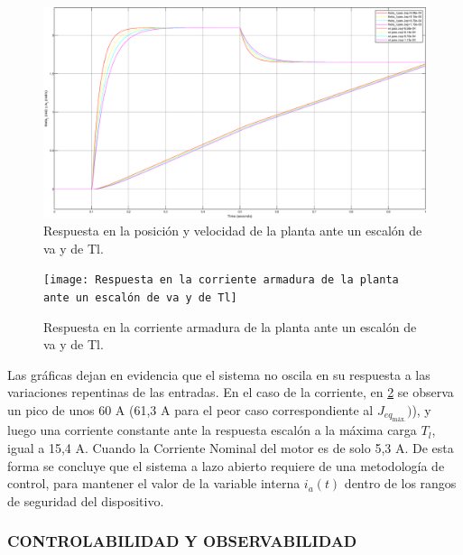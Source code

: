 \documentclass{article}
\begin{document}
\begin{sloppypar}
\begin{figure}[H]
    \centering
    \includegraphics[width=1\textwidth]{Respuesta en la posición y velocidad de la planta ante un escalón de va y de Tl}
    \caption{Respuesta en la posición y velocidad de la planta ante un escalón de va y de Tl.}
    \label{fig:Respuesta en la posición y velocidad de la planta ante un escalón de va y de Tl}
\end{figure}

\begin{figure}[H]
    \centering
    \texttt{[image: Respuesta en la corriente armadura de la planta ante un escalón de va y de Tl]}
    \caption{Respuesta en la corriente armadura de la planta ante un escalón de va y de Tl.}
    \label{fig:Respuesta en la corriente armadura de la planta ante un escalón de va y de Tl}
\end{figure}

Las gráficas dejan en evidencia que el sistema no oscila en su respuesta a las variaciones repentinas de las entradas.
En el caso de la corriente, en \ref{fig:Respuesta en la corriente armadura de la planta ante un escalón de va y de Tl} se observa un pico de unos 60 A (61,3 A para el peor caso correspondiente al $J_{eq_{\text{máx.}}})$), y luego una corriente constante ante la respuesta escalón a la máxima carga $T_l$, igual a 15,4 A. Cuando la Corriente Nominal del motor es de solo 5,3 A. De esta forma se concluye que el sistema a lazo abierto requiere de una metodología de control, para mantener el valor de la variable interna $i_a(t)$ dentro de los rangos de seguridad del dispositivo.


\subsubsection{CONTROLABILIDAD Y OBSERVABILIDAD}
\label{sec:CONTROLABILIDAD Y OBSERVABILIDAD}


\end{sloppypar}
\end{document}
